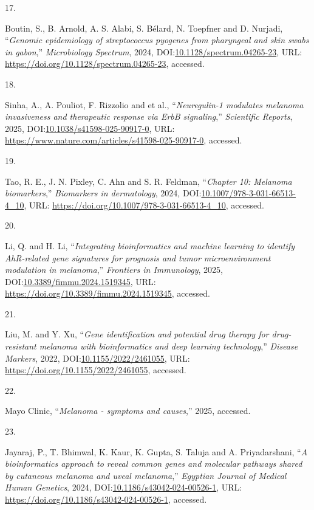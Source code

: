 \documentclass[
]{article}
\newlength{\cslhangindent}
\newlength{\csllabelwidth}
\newenvironment{CSLReferences}[2] %
 {\begin{list}{}{%
  \setlength{\itemindent}{0pt}
  \setlength{\leftmargin}{0pt}
  \setlength{\parsep}{0pt}
  \ifodd #1
   \setlength{\leftmargin}{\cslhangindent}
   \setlength{\itemindent}{-1\cslhangindent}
  \fi
  \setlength{\itemsep}{#2\baselineskip}}}
 {\end{list}}
\newcommand{\CSLLeftMargin}[1]{\parbox[t]{\csllabelwidth}{\strut#1\strut}}
\newcommand{\CSLRightInline}[1]{\parbox[t]{\linewidth - \csllabelwidth}{\strut#1\strut}}
\begin{document}
\begin{CSLReferences}{0}{1}
\CSLLeftMargin{17. }%
\CSLRightInline{Boutin, S., B. Arnold, A. S. Alabi, S. Bélard, N.
Toepfner and D. Nurjadi, {``\emph{Genomic epidemiology of
\emph{streptococcus pyogenes} from pharyngeal and skin swabs in
gabon},''} \emph{Microbiology Spectrum}, 2024,
DOI:\href{https://doi.org/10.1128/spectrum.04265-23}{10.1128/spectrum.04265-23},
URL: \url{https://doi.org/10.1128/spectrum.04265-23}, accessed.}

\CSLLeftMargin{18. }%
\CSLRightInline{Sinha, A., A. Pouliot, F. Rizzolio and et al.,
{``\emph{Neuregulin-1 modulates melanoma invasiveness and therapeutic
response via ErbB signaling},''} \emph{Scientific Reports}, 2025,
DOI:\href{https://doi.org/10.1038/s41598-025-90917-0}{10.1038/s41598-025-90917-0},
URL: \url{https://www.nature.com/articles/s41598-025-90917-0},
accessed.}

\CSLLeftMargin{19. }%
\CSLRightInline{Tao, R. E., J. N. Pixley, C. Ahn and S. R. Feldman,
{``\emph{Chapter 10: Melanoma biomarkers},''} \emph{Biomarkers in
dermatology}, 2024,
DOI:\href{https://doi.org/10.1007/978-3-031-66513-4_10}{10.1007/978-3-031-66513-4\_10},
URL: \url{https://doi.org/10.1007/978-3-031-66513-4_10}, accessed.}

\CSLLeftMargin{20. }%
\CSLRightInline{Li, Q. and H. Li, {``\emph{Integrating bioinformatics
and machine learning to identify AhR-related gene signatures for
prognosis and tumor microenvironment modulation in melanoma},''}
\emph{Frontiers in Immunology}, 2025,
DOI:\href{https://doi.org/10.3389/fimmu.2024.1519345}{10.3389/fimmu.2024.1519345},
URL: \url{https://doi.org/10.3389/fimmu.2024.1519345}, accessed.}

\CSLLeftMargin{21. }%
\CSLRightInline{Liu, M. and Y. Xu, {``\emph{Gene identification and
potential drug therapy for drug-resistant melanoma with bioinformatics
and deep learning technology},''} \emph{Disease Markers}, 2022,
DOI:\href{https://doi.org/10.1155/2022/2461055}{10.1155/2022/2461055},
URL: \url{https://doi.org/10.1155/2022/2461055}, accessed.}

\CSLLeftMargin{22. }%
\CSLRightInline{Mayo Clinic, {``\emph{Melanoma - symptoms and
causes},''} 2025, accessed.}

\CSLLeftMargin{23. }%
\CSLRightInline{Jayaraj, P., T. Bhimwal, K. Kaur, K. Gupta, S. Taluja
and A. Priyadarshani, {``\emph{A bioinformatics approach to reveal
common genes and molecular pathways shared by cutaneous melanoma and
uveal melanoma},''} \emph{Egyptian Journal of Medical Human Genetics},
2024,
DOI:\href{https://doi.org/10.1186/s43042-024-00526-1}{10.1186/s43042-024-00526-1},
URL: \url{https://doi.org/10.1186/s43042-024-00526-1}, accessed.}


\end{CSLReferences}
\end{document}
